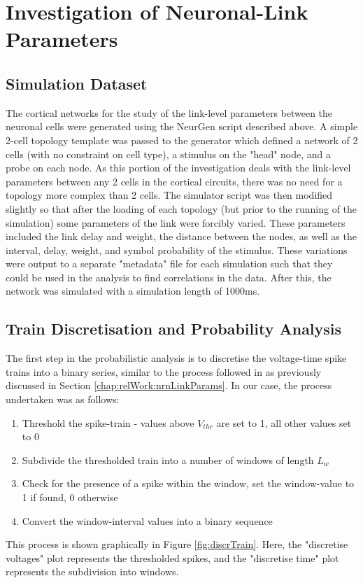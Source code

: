\section{Investigation of Neuronal-Link Parameters}
\subsection{Simulation Dataset}
\label{chap:meth:llMeth}

The cortical networks for the study of the link-level parameters between the neuronal cells were generated using the NeurGen script described above. A simple 2-cell topology template was passed to the generator which defined a network of 2 cells (with no constraint on cell type), a stimulus on the "head" node, and a probe on each node. As this portion of the investigation deals with the link-level parameters between any 2 cells in the cortical circuits, there was no need for a topology more complex than 2 cells. The simulator script was then modified slightly so that after the loading of each topology (but prior to the running of the simulation) some parameters of the link were forcibly varied. These parameters included the link delay and weight, the distance between the nodes, as well as the interval, delay, weight, and symbol probability of the stimulus. These variations were output to a separate "metadata" file for each simulation such that they could be used in the analysis to find correlations in the data. After this, the network was simulated with a simulation length of 1000ms.

\subsection{Train Discretisation and Probability Analysis}
The first step in the probabilistic analysis is to discretise the voltage-time spike trains into a binary series, similar to the process followed in \cite{spikeTrainInfo} as previously discussed in Section \ref{chap:relWork:nrnLinkParams}. In our case, the process undertaken was as follows:
\begin{enumerate}
    \item Threshold the spike-train - values above $V_{thr}$ are set to 1, all other values set to 0
    \item Subdivide the thresholded train into a number of windows of length $L_{w}$
    \item Check for the presence of a spike within the window, set the window-value to 1 if found, 0 otherwise
    \item Convert the window-interval values into a binary sequence
\end{enumerate}
This process is shown graphically in Figure \ref{fig:discrTrain}. Here, the "discretise voltages" plot represents the thresholded spikes, and the "discretise time" plot represents the subdivision into windows.

